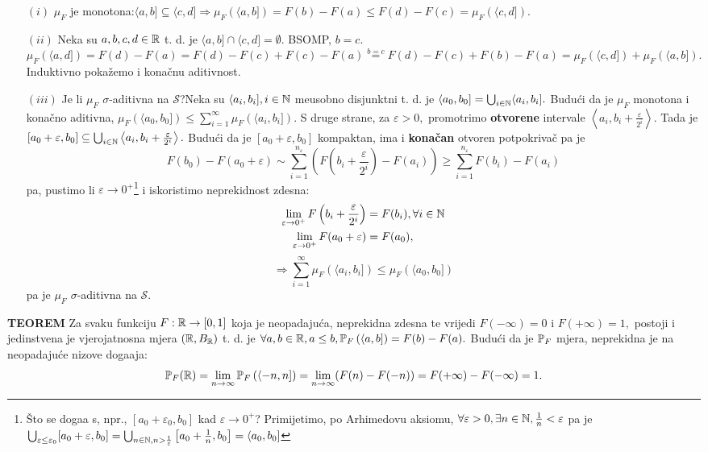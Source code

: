 \documentclass{article}
\begin{document}
\begin{itemize}
    \item[\((i)\)] \(\mu_F\) je monotona:\newline \(\langle a,b]\subseteq\langle c,d]\Rightarrow\mu_F\left(\langle a,b]\right)=F(b)-F(a)\le F(d)-F(c)=\mu_F\left(\langle c,d]\right).\)
    \item[\((ii)\)] Neka su \(a,b,c,d\in\Bbb R\) t. d. je \(\langle a,b]\cap\langle c,d]=\emptyset.\) BSOMP, \(b=c.\) \newline \(\mu_F\left(\langle a,d]\right)=F(d)-F(a)=F(d)-F(c)+F(c)-F(a)\overset{b=c}{=}F(d)-F(c)+F(b)-F(a)=\mu_F\left(\langle c,d]\right)+\mu_F\left(\langle a,b]\right).\) Induktivno pokažemo i konačnu aditivnost.
    \item[\((iii)\)] Je li \(\mu_F\) \(\sigma\)-aditivna na \(\mathcal S\)?\newline Neka su \(\langle a_i,b_i],i\in\Bbb N\) me\dj{}usobno disjunktni t. d. je  \(\langle a_0,b_0]=\bigcup_{i\in\Bbb N}\langle a_i,b_i].\) Budući da je \(\mu_F\) monotona i konačno aditivna, \(\mu_F\left(\langle a_0,b_0]\right)\le\sum_{i=1}^\infty\mu_F\left(\langle a_i,b_i]\right).\) S druge  strane, za \(\varepsilon>0,\) promotrimo \textbf{otvorene} intervale \(\left\langle a_i,b_i+\frac\varepsilon{2^i}\right\rangle.\) Tada je \([a_0+\varepsilon,b_0]\subseteq\bigcup_{i\in\Bbb N}\left\langle a_i,b_i+\frac\varepsilon{2^i}\right\rangle.\) Budući da je \([a_0+\varepsilon,b_0]\) kompaktan, ima i \textbf{konačan} otvoren potpokrivač pa je \[F(b_0)-F(a_0+\varepsilon)\sim\sum_{i=1}^{n_\varepsilon}\left(F\left(b_i+\frac\varepsilon{2^i}\right)-F(a_i)\right)\ge\sum_{i=1}^{n_\varepsilon}F(b_i)-F(a_i)\] pa, pustimo li \(\varepsilon\to 0^+\)\footnote[48]{Što se doga\dj{}a s, npr., \([a_0+\varepsilon_0,b_0]\) kad \(\varepsilon\to 0^+\)? Primijetimo, po Arhimedovu aksiomu, \(\forall\varepsilon>0,\exists n\in\Bbb N,\frac1n<\varepsilon\) pa je \(\bigcup_{\varepsilon\le\varepsilon_0}[a_0+\varepsilon,b_0]=\bigcup_{n\in\Bbb N,n>\frac1\varepsilon}\left[a_0+\frac1n,b_0\right]=\langle a_0,b_0]\)} i iskoristimo neprekidnost zdesna: \[\begin{aligned}\lim_{\varepsilon\to 0^+}F\left(b_i+\frac\varepsilon{2^i}\right)&=F(b_i),\forall i\in\Bbb N\\\lim_{\varepsilon\to 0^+}F(a_0+\varepsilon)&=F(a_0),\end{aligned}\] \[\Rightarrow\sum_{i=1}^\infty\mu_F\left(\langle a_i,b_i]\right)\le\mu_F\left(\langle a_0,b_0]\right)\] pa je \(\mu_F\) \(\sigma\)-aditivna na \(\mathcal S.\) 
\end{itemize}
\textbf{TEOREM}\newline
Za svaku funkciju \(F:\Bbb R\to[0,1]\) koja je neopadajuća, neprekidna zdesna te vrijedi \(F(-\infty)=0\) i \(F(+\infty)=1,\) postoji i jedinstvena je vjerojatnosna mjera \(\left(\Bbb R,B_\Bbb R\right)\) t. d. je \(\forall a,b\in\Bbb R,a\le b,\Bbb P_F\left(\langle a,b]\right)=F(b)-F(a).\)\newline\newline
Budući da je \(\Bbb P_F\) mjera, neprekidna je na neopadajuće nizove doga\dj{}aja: \[\Bbb P_F(\Bbb R)=\lim_{n\to\infty}\Bbb P_F\left(\langle-n,n]\right)=\lim_{n\to\infty}(F(n)-F(-n))=F(+\infty)-F(-\infty)=1.\] 
\newpage
\end{document}
